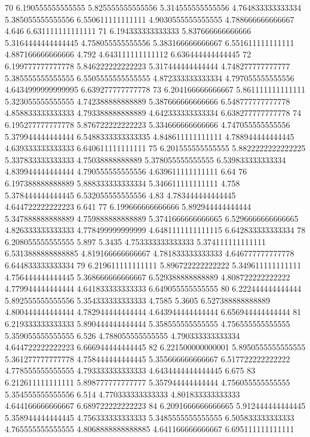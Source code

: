70 6.190555555555555 5.825555555555556 5.314555555555556 4.764833333333334 5.385055555555556 6.550611111111111 4.9030555555555555 4.788666666666667 4.646 6.631111111111111
71 6.194333333333333 5.837666666666666 5.3164444444444445 4.758055555555556 5.383166666666667 6.551611111111111 4.887166666666666 4.792 4.643111111111112 6.636444444444445
72 6.199777777777778 5.846222222222223 5.317444444444444 4.748277777777777 5.385555555555555 6.5505555555555555 4.872333333333334 4.797055555555556 4.6434999999999995 6.639277777777778
73 6.204166666666667 5.861111111111111 5.323055555555555 4.742388888888889 5.387666666666666 6.548777777777778 4.858833333333333 4.793388888888889 4.642333333333334 6.638277777777778
74 6.195277777777778 5.876722222222223 5.334666666666666 4.747055555555556 5.379944444444444 6.5488333333333335 4.848611111111111 4.788944444444445 4.639333333333333 6.640611111111111
75 6.201555555555555 5.8822222222222225 5.337833333333333 4.75038888888889 5.378055555555555 6.539833333333334 4.839944444444444 4.790555555555556 4.639611111111111 6.64
76 6.197388888888889 5.888333333333334 5.346611111111111 4.758 5.378444444444445 6.532055555555556 4.83 4.783444444444445 4.644722222222223 6.641
77 6.199666666666666 5.892944444444444 5.347888888888889 4.759888888888889 5.3741666666666665 6.5296666666666665 4.826333333333333 4.778499999999999 4.6481111111111115 6.642833333333334
78 6.208055555555555 5.897 5.3435 4.753333333333333 5.374111111111111 6.5313888888888885 4.819166666666667 4.781833333333333 4.646777777777778 6.644833333333334
79 6.219611111111111 5.896722222222222 5.349611111111111 4.756444444444445 5.368666666666667 6.529388888888889 4.808722222222222 4.779944444444444 4.641833333333333 6.649055555555555
80 6.222444444444444 5.892555555555556 5.354333333333333 4.7585 5.3605 6.527388888888889 4.800444444444444 4.782944444444444 4.643944444444444 6.656944444444444
81 6.219333333333333 5.890444444444444 5.358555555555555 4.756555555555555 5.359055555555555 6.526 4.788055555555555 4.790333333333334 4.644722222222223 6.666944444444445
82 6.221500000000001 5.8950555555555555 5.361277777777778 4.758444444444445 5.355666666666667 6.517722222222222 4.778555555555555 4.793333333333333 4.6434444444444445 6.675
83 6.212611111111111 5.898777777777777 5.357944444444444 4.756055555555555 5.354555555555556 6.514 4.770333333333333 4.801833333333333 4.644166666666667 6.689722222222223
84 6.2091666666666665 5.912444444444445 5.358944444444445 4.756333333333333 5.3485555555555555 6.505833333333333 4.765555555555555 4.8068888888888885 4.641166666666667 6.695111111111111
